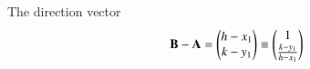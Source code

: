 The direction vector
\begin{align}
	\mathbf{B}-\mathbf{A}
	=
	\begin{pmatrix}
  h-x_1\\
  k-y_1
  \end{pmatrix}
   \equiv
	\begin{pmatrix}
1\\
	\frac{ k-y_1}{h-x_1}
  \end{pmatrix}
\end{align}
